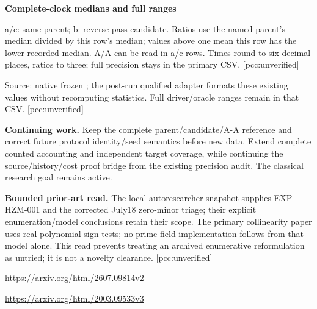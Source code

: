 \documentclass[10pt]{article}
\begin{document}
\clearpage
{\Large\bfseries Complete-clock medians and full ranges}

a/c: same parent; b: reverse-pass candidate. Ratios use the named parent's
median divided by this row's median; values above one mean this row has the
lower recorded median. A/A can be read in a/c rows. Times round to six decimal
places, ratios to three; full precision stays in the primary CSV.
[pcc:unverified]

\begin{center}\small
\setlength{\tabcolsep}{5pt}

\end{center}

\small Source: native frozen ; the post-run qualified
adapter formats these existing values without recomputing statistics.
Full driver/oracle ranges remain in that CSV. [pcc:unverified]

\textbf{Continuing work.} Keep the complete parent/candidate/A-A reference and
correct future protocol identity/seed semantics before new data. Extend complete
counted accounting and independent target coverage, while continuing the
source/history/cost proof bridge from the existing precision audit. The
classical research goal remains active.

\textbf{Bounded prior-art read.} The local autoresearcher snapshot supplies
EXP-HZM-001 and the corrected July18 zero-minor triage; their explicit
enumeration/model conclusions retain their scope. The primary collinearity
paper uses real-polynomial sign tests; no prime-field implementation follows
from that model alone. This read prevents treating an archived enumerative
reformulation as untried; it is not a novelty clearance. [pcc:unverified]

\url{https://arxiv.org/html/2607.09814v2}\par
\url{https://arxiv.org/html/2003.09533v3}\par
{}
\end{document}

